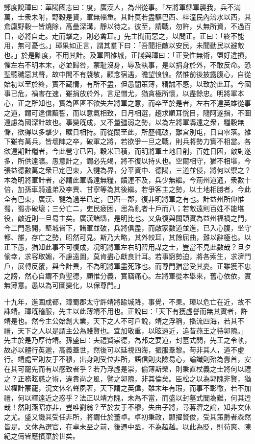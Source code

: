 \begin{pinyinscope}
鄭度說璋曰：華陽國志曰：度，廣漢人，為州從事。「左將軍縣軍襲我，兵不滿萬，士衆未附，野穀是資，軍無輜重。其計莫若盡驅巴西、梓潼民內涪水以西，其倉廩野穀一皆燒除，高壘深溝，靜以待之。彼至，請戰，勿許，乆無所資，不過百日，必將自走。走而擊之，則必禽耳。」先主聞而惡之，以問正。正曰：「終不能用，無可憂也。」璋果如正言，謂其羣下曰：「吾聞拒敵以安民，未聞動民以避敵也。」於是黜度，不用其計。及軍圍雒城，正牋與璋曰：「正受性無術，盟好違損，懼左右不明本末，必並歸咎，蒙耻沒身，辱及執事，是以捐身於外，不敢反命。恐聖聽穢惡其聲，故中間不有牋敬，顧念宿遇，瞻望悢悢。然惟前後披露腹心，自從始初以至於終，實不藏情，有所不盡，但愚闇策薄，精誠不感，以致於此耳。今國事已危，禍害在速，雖捐放於外，言足憎尤，猶貪極所懷，以盡餘忠。明將軍本心，正之所知也，實為區區不欲失左將軍之意，而卒至於是者，左右不達英雄從事之道，謂可違信黷誓，而以意氣相致，日月相選，趨求順耳恱目，隨阿遂指，不圖遠慮為國深計故也。事變旣成，又不量彊弱之勢，以為左將軍縣遠之衆，糧穀無儲，欲得以多擊少，曠日相持。而從關至此，所歷輒破，離宮別屯，日自零落。雒下雖有萬兵，皆壞陣之卒，破軍之將，若欲爭一旦之戰，則兵將勢力實不相當。各欲遠期計糧者，今此營守已固，穀米已積，而明將軍土地日削，百姓日困，敵對遂多，所供遠曠。愚意計之，謂必先竭，將不復以持乆也。空爾相守，猶不相堪，今張益德數萬之衆已定巴東，入犍為界，分平資中、德陽，三道並侵，將何以禦之？本為明將軍計者，必謂此軍縣遠無糧，饋運不及，兵少無繼。今荊州道通，衆數十倍，加孫車騎遣弟及李異、甘寧等為其後繼。若爭客主之勢，以土地相勝者，今此全有巴東，廣漢、犍為過半已定，巴西一郡，復非明將軍之有也。計益州所仰惟蜀，蜀亦破壞；三分亡二，吏民疲困，思為亂者十戶而八；若敵遠則百姓不能堪役，敵近則一旦易主矣。廣漢諸縣，是明比也。又魚復與關頭實為益州福禍之門，今二門悉開，堅城皆下，諸軍並破，兵將俱盡，而敵家數道並進，已入心腹，坐守都、雒，存亡之勢，昭然可見。斯乃大略，其外較耳，其餘屈曲，難以辭極也。以正下愚，猶知此事不可復成，况明將軍左右明智用謀之士，豈當不見此數哉？旦夕偷幸，求容取媚，不慮遠圖，莫肯盡心獻良計耳。若事窮勢迫，將各索生，求濟門戶，展轉反覆，與今計異，不為明將軍盡死難也。而尊門猶當受其憂。正雖獲不忠之謗，然心自謂不負聖德，顧惟分義，實竊痛心。左將軍從本舉來，舊心依依，實無薄意。愚以為可圖變化，以保尊門。」

十九年，進圍成都，璋蜀郡太守許靖將踰城降，事覺，不果。璋以危亡在近，故不誅靖。璋旣稽服，先主以此薄靖不用也。正說曰：「天下有獲虛譽而無其實者，許靖是也。然今主公始創大業，天下之人不可戶說，靖之浮稱，播流四海，若其不禮，天下之人以是謂主公為賤賢也。宜加敬重，以眩遠近，追昔燕王之待郭隗。」先主於是乃厚待靖。孫盛曰：夫禮賢崇德，為邦之要道，封墓式閭，先王之令軌，故必以體行英邈，高義蓋世，然後可以延視四海，振服羣黎。苟非其人，道不虛行。靖處室則友于不穆，出身則受位非所，語信則夷險易心，論識則殆為釁首，安在其可寵先而有以感致者乎？若乃浮虛是崇，偷薄斯榮，則秉直杖義之士將何以禮之？正務眩惑之術，違貴尚之風，譬之郭隗，非其倫矣。臣松之以為郭隗非賢，猶以權計蒙寵，況文休名聲夙著，天下謂之英偉，雖末年有瑕，而事不彰徹，若不加禮，何以釋遠近之惑乎？法正以靖方隗，未為不當，而盛以封墓式閭為難，何其迃哉！然則燕昭亦非，豈唯劉翁？至於友于不穆，失由子將，尋蔣濟之論，知非文休之尤。盛又譏其受任非所，將謂仕於董卓。卓初秉政，顯擢賢俊，受其策爵者森然皆是。文休為選官，在卓未至之前，後遷中丞，不為超越。以此為貶，則荀爽、陳紀之儔皆應擯棄於世矣。


\end{pinyinscope}
